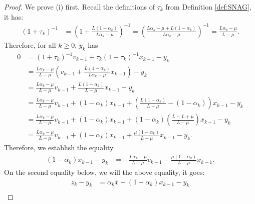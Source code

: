 \documentclass[12pt]{article}
\begin{document}
    \begin{proof}
        We prove (i) first. 
        Recall the definitions of $\tau_k$ from Definition \ref{def:SNAG}, it has: 
        \begin{align*}
            (1 + \tau_k)^{-1}
            &=
            \left(
                1 + \frac{L(1 - \alpha_k)}{L\alpha_k - \mu}
            \right)^{-1} = \left(
                \frac{L\alpha_k - \mu + L(1 - \alpha_k)}{L\alpha_k - \mu}
            \right)^{-1}
            = \frac{L\alpha_k - \mu}{L - \mu}. 
        \end{align*}
        Therefore, for all $k \ge 0$, $y_k$ has 
        \begin{align*}
            0 &= (1 + \tau_k)^{-1} v_{k - 1} + \tau_k (1 + \tau_k)^{-1} x_{k - 1} - y_k
            \\
            &= \frac{L\alpha_k - \mu}{L - \mu} 
            \left(
                v_{k - 1} + \frac{L(1 - \alpha_k)}{L\alpha_k - \mu} x_{k - 1}
            \right) - y_k
            \\
            &= \frac{L\alpha_k - \mu}{L - \mu} v_{k - 1}
            + \frac{L(1 - \alpha_k)}{L - \mu} x_{k - 1} - y_k
            \\
            &= \frac{L\alpha_k - \mu}{L - \mu} v_{k - 1} + (1 - \alpha_k)x_{k - 1}
            + 
            \left(
                \frac{L(1 - \alpha_k)}{L - \mu} - (1 - \alpha_k)
            \right) x_{k - 1} - y_k
            \\
            &= \frac{L\alpha_k - \mu}{L - \mu} v_{k - 1} + (1 - \alpha_k)x_{k - 1}
            + 
            (1 - \alpha_k)\left(
                \frac{L - L + \mu}{L - \mu}
            \right) x_{k - 1} - y_k
            \\
            &= \frac{L\alpha_k - \mu}{L - \mu} v_{k - 1} + (1 - \alpha_k)x_{k - 1}
            + 
            \frac{\mu(1 - \alpha_k)}{L - \mu}x_{k - 1} - y_k. 
        \end{align*}
        Therefore, we establish the equality 
        \begin{align*}
            (1 - \alpha_k)x_{k - 1} - y_k &= 
            - \frac{L\alpha_k - \mu}{L - \mu} v_{k - 1} 
            - \frac{\mu(1 - \alpha_k)}{L - \mu} x_{k - 1}. 
        \end{align*}
        On the second equality below, we will the above equality, it goes: 
        \begin{align*}
            z_k - y_k &= 
            \alpha_k \bar x + (1 - \alpha_k)x_{k - 1} - y_k
            \\

\end{align*}
\end{proof}
\end{document}

